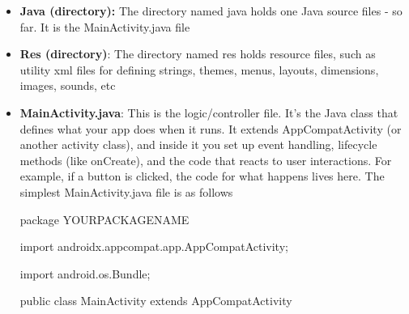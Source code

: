 \documentclass{report}
\begin{document}
\begin{itemize}
        \item \textbf{Java (directory):} The directory named java holds one Java source files - so far. It is the MainActivity.java file
        \item \textbf{Res (directory)}: The directory named res holds resource files, such as utility xml files for defining strings, themes, menus, layouts, dimensions, images, sounds, etc
        \item \textbf{MainActivity.java}: This is the logic/controller file. It's the Java class that defines what your app does when it runs. It extends AppCompatActivity (or another activity class), and inside it you set up event handling, lifecycle methods (like onCreate), and the code that reacts to user interactions. For example, if a button is clicked, the code for what happens lives here.
            \bigbreak \noindent 
            The simplest MainActivity.java file is as follows
            \bigbreak \noindent 
            \begin{javacode}
                package YOURPACKAGENAME

                import androidx.appcompat.app.AppCompatActivity;

                import android.os.Bundle;

                public class MainActivity extends AppCompatActivity {

}
\end{javacode}
\end{itemize}
\end{document}
